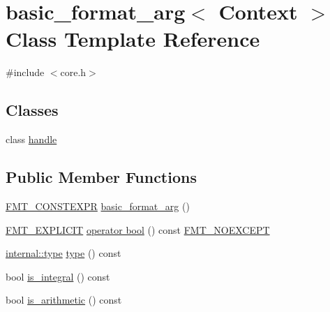 \hypertarget{classbasic__format__arg}{}\section{basic\+\_\+format\+\_\+arg$<$ Context $>$ Class Template Reference}
\label{classbasic__format__arg}


{\ttfamily \#include $<$core.\+h$>$}

\subsection*{Classes}
\begin{DoxyCompactItemize}
\item 
class \hyperlink{classbasic__format__arg_1_1handle}{handle}
\end{DoxyCompactItemize}
\subsection*{Public Member Functions}
\begin{DoxyCompactItemize}
\item 
\hyperlink{core_8h_a69201cb276383873487bf68b4ef8b4cd}{F\+M\+T\+\_\+\+C\+O\+N\+S\+T\+E\+X\+PR} \hyperlink{classbasic__format__arg_a26cca2d5a0c9da5edb3316f481eae3ec}{basic\+\_\+format\+\_\+arg} ()
\item 
\hyperlink{core_8h_ac5e450936052d8a4292d6e609e73e2bd}{F\+M\+T\+\_\+\+E\+X\+P\+L\+I\+C\+IT} \hyperlink{classbasic__format__arg_abc1e6f7725cce939c9c94be860cc32e1}{operator bool} () const \hyperlink{core_8h_aef128913e8400683b1cbd1a3a2e11df3}{F\+M\+T\+\_\+\+N\+O\+E\+X\+C\+E\+PT}
\item 
\hyperlink{namespaceinternal_a8661864098ac0acff9a6dd7e66f59038}{internal\+::type} \hyperlink{classbasic__format__arg_adf7349643b80568c84a5872b89b2f141}{type} () const
\item 
bool \hyperlink{classbasic__format__arg_af7036c26bebf95df5766215ec9c1ec06}{is\+\_\+integral} () const
\item 
bool \hyperlink{classbasic__format__arg_a14c5f1e0b933900dbc2d6fe1b6fd5ae1}{is\+\_\+arithmetic} () const
\end{DoxyCompactItemize}
